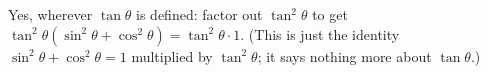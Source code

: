 Yes, wherever $\tan\theta$ is defined: factor out $\tan^2\theta$ to get $\tan^2\theta\left(\sin^2\theta+\cos^2\theta\right)=\tan^2\theta\cdot1$. (This is just the identity $\sin^2\theta+\cos^2\theta=1$ multiplied by $\tan^2\theta$; it says nothing more about $\tan\theta$.)
